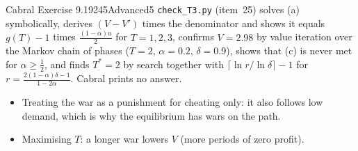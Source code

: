 \begin{exsol}{Cabral Exercise 9.19}{245}{Advanced}{5}
\verify \texttt{check\_T3.py} (item~25) solves (a) symbolically, derives $(V - V')$ times the denominator and
shows it equals $g(T) - 1$ times $\frac{(1-\alpha)u}{2}$ for $T = 1,2,3$, confirms $V = 2.98$ by value iteration over the
Markov chain of phases ($T = 2$, $\alpha = 0.2$, $\delta = 0.9$), shows that (c) is never met for $\alpha \ge \frac12$,
and finds $T^* = 2$ by search together with $\lceil\ln r / \ln\delta\rceil - 1$ for $r = \frac{2(1-\alpha)\delta - 1}{1-2\alpha}$.
Cabral prints no answer.

\mistakes
\begin{itemize}
  \item Treating the war as a punishment for cheating only: it also follows low demand, which is why the equilibrium
  has wars on the path.
  \item Maximising $T$: a longer war lowers $V$ (more periods of zero profit).
\end{itemize}

\end{exsol}
